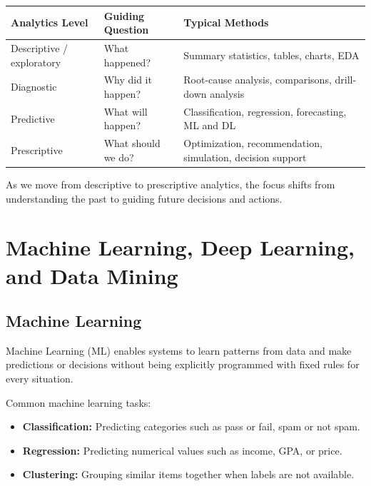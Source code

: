 \documentclass[11pt,a4paper]{article}
\begin{document}
\begin{longtable}{@{}p{3.1cm}p{3.8cm}p{5.2cm}@{}}
\toprule
\rowcolor{primary!15}
\textbf{Analytics Level} & \textbf{Guiding Question} & \textbf{Typical Methods} \\
\midrule
\endhead
Descriptive / exploratory & What happened? & Summary statistics, tables, charts, EDA \\
\addlinespace
Diagnostic & Why did it happen? & Root-cause analysis, comparisons, drill-down analysis \\
\addlinespace
Predictive & What will happen? & Classification, regression, forecasting, ML and DL \\
\addlinespace
Prescriptive & What should we do? & Optimization, recommendation, simulation, decision support \\
\bottomrule
\end{longtable}

\begin{conceptbox}
As we move from descriptive to prescriptive analytics, the focus shifts from understanding the past to guiding future decisions and actions.
\end{conceptbox}

\section{Machine Learning, Deep Learning, and Data Mining}

\subsection{Machine Learning}

\begin{definitionbox}
Machine Learning (ML) enables systems to learn patterns from data and make predictions or decisions without being explicitly programmed with fixed rules for every situation.
\end{definitionbox}

Common machine learning tasks:
\begin{itemize}[leftmargin=*]
  \item \textbf{Classification:} Predicting categories such as pass or fail, spam or not spam.
  \item \textbf{Regression:} Predicting numerical values such as income, GPA, or price.
  \item \textbf{Clustering:} Grouping similar items together when labels are not available.
\end{itemize}
\end{document}
